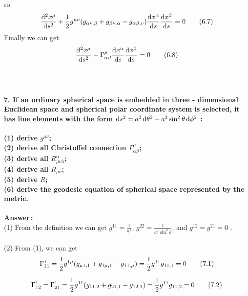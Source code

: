 \documentclass[12pt]{article}
\begin{document}
so
\begin{equation}
\displaystyle 
\frac{\mathop{}\!\mathrm{d}^{2}x^{\mu}}{\mathop{}\!\mathrm{d} s^{2}}+\frac{1}{2}g^{\mu\nu}(g_{\alpha\nu,\beta}+g_{\beta\nu,\alpha}-g_{\alpha\beta,\nu})\frac{\mathop{}\!\mathrm{d} x^{\alpha}}{\mathop{}\!\mathrm{d} s}\frac{\mathop{}\!\mathrm{d} x^{\beta}}{\mathop{}\!\mathrm{d} s}=0
	\tag{6.7}
\end{equation}
Finally we can get
\begin{equation}
\displaystyle 
\frac{\mathop{}\!\mathrm{d}^{2}x^{\mu}}{\mathop{}\!\mathrm{d} s^{2}}+\Gamma^{\mu}_{\alpha\beta}\frac{\mathop{}\!\mathrm{d} x^{\alpha}}{\mathop{}\!\mathrm{d} s}\frac{\mathop{}\!\mathrm{d} x^{\beta}}{\mathop{}\!\mathrm{d} s}=0
	\tag{6.8}
\end{equation}
~\\
~\\
~\\
\textbf{7. If an ordinary spherical space is embedded in three - dimensional Euclidean space and spherical polar coordinate system is selected, it has line elements with the form $\mathop{}\!\mathrm{d} s^{2}=a^{2}\mathop{}\!\mathrm{d}\theta^{2}+a^{2}\sin^{2}\theta\mathop{}\!\mathrm{d}\phi^{2}$ :} \\	
~\\
\textbf{(1) derive $g^{\mu\nu}$;}\\
\textbf{(2) derive all Christoffel connection $\Gamma^{\mu}_{\alpha\beta}$;}\\
\textbf{(3) derive all $R^{\alpha}_{\mu\nu\lambda}$;}\\
\textbf{(4) derive all $R_{\mu\nu}$;}\\
\textbf{(5) derive $R$;}\\
\textbf{(6) derive the geodesic equation of spherical space represented by the metric.}\\
~\\
\textbf{Answer\,:}\\
(1) From the definition we can get $\displaystyle g^{11}=\frac{1}{a^{2}}$, $\displaystyle g^{22}=\frac{1}{a^{2}\sin^{2}\theta}$, and $g^{12}=g^{21}=0$ . \\
~\\
(2) From (1), we can get
\begin{equation}
\displaystyle 
\Gamma^{1}_{11} = \frac{1}{2}g^{1\mu}(g_{\mu1,1}+g_{1\mu,1}-g_{11,\mu})=\frac{1}{2}g^{11}g_{11,1}=0\\
	\tag{7.1}
\end{equation}

\begin{equation}
\displaystyle 
\Gamma^{1}_{12} = \Gamma^{1}_{21} = \frac{1}{2}g^{11}(g_{11,2}+g_{21,1}-g_{12,1})=\frac{1}{2}g^{11}g_{11,2}=0\\
	\tag{7.2}
\end{equation}
\end{document}

